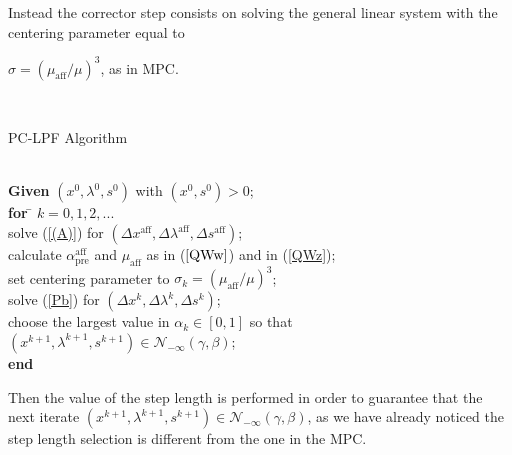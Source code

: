 \documentclass[a4paper,10 pt,titlepage,twoside]{book}
\theoremstyle{plain}
\theoremstyle{definition}
\theoremstyle{remark}
\begin{document}
Instead the corrector step consists on solving the general linear system with the centering parameter equal to \begin{center*}
$\sigma = (\mu_{\text{aff}}/\mu)^{3}$, as in MPC.
\end{center*}\\
\begin{algorithm}[H]\caption{\label{alg:pc}PC-LPF Algorithm}
	\begin{tabbing}
		\\
		\textbf{Given} $(x^{0}, \lambda^{0}, s^{0})$ with $(x^{0}, s^{0})> 0$; \\
		\textbf{for} \= $k = 0, 1, 2,...$ \\
		\> solve (\ref{(A)}) for $(\Delta x^{\text{aff}},\Delta \lambda^{\text{aff}},\Delta s^{\text{aff}})$;\\
		\> calculate $\alpha_{\text{pre}}^{\text{aff}}$ and $\mu_{\text{aff}}$ as in ($\ref{QWw}$) and in (\ref{QWz});\\
		\> set centering parameter to $\sigma_{k} = (\mu_{\text{aff}}/\mu)^{3}$; \\
		\> solve (\ref{Pb}) for $(\Delta x^{k},\Delta \lambda^{k},\Delta s^{k})$;\\
		\> choose the largest value in $\alpha_{k}\in[0,1]$ so that $(x^{k+1}, \lambda^{k+1}, s^{k+1})\in\mathcal{N}_{-\infty}(\gamma,\beta)$;\\
		\textbf{end}
	\end{tabbing}
\end{algorithm}
 Then the value of the step length is performed in order to guarantee that the next iterate $(x^{k+1}, \lambda^{k+1}, s^{k+1})\in\mathcal{N}_{-\infty}(\gamma,\beta)$, as we have already noticed the step length selection is different from the one in the MPC.
\newpage
\end{document}
